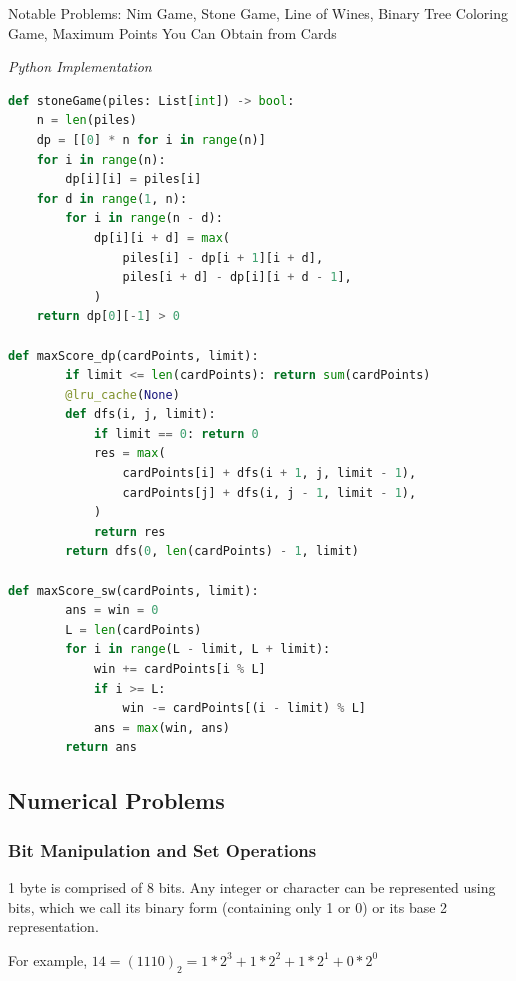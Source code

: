 \documentclass{article}
\begin{document}
Notable Problems: Nim Game, Stone Game, Line of Wines, Binary Tree Coloring Game, Maximum Points You Can Obtain from Cards

\vspace{8pt} \emph{Python Implementation}
\begin{lstlisting}[language=Python]
def stoneGame(piles: List[int]) -> bool:
    n = len(piles)
    dp = [[0] * n for i in range(n)]
    for i in range(n):
        dp[i][i] = piles[i]
    for d in range(1, n):
        for i in range(n - d):
            dp[i][i + d] = max(
                piles[i] - dp[i + 1][i + d],
                piles[i + d] - dp[i][i + d - 1],
            )
    return dp[0][-1] > 0

def maxScore_dp(cardPoints, limit):
        if limit <= len(cardPoints): return sum(cardPoints)
        @lru_cache(None)
        def dfs(i, j, limit):
            if limit == 0: return 0
            res = max(
                cardPoints[i] + dfs(i + 1, j, limit - 1), 
                cardPoints[j] + dfs(i, j - 1, limit - 1),
            )
            return res
        return dfs(0, len(cardPoints) - 1, limit)
        
def maxScore_sw(cardPoints, limit):
        ans = win = 0
        L = len(cardPoints)
        for i in range(L - limit, L + limit):
            win += cardPoints[i % L]
            if i >= L:
                win -= cardPoints[(i - limit) % L]
            ans = max(win, ans)    
        return ans
\end{lstlisting}

    \subsection{Numerical Problems}
    
    \subsubsection{Bit Manipulation and Set Operations}
    1 byte is comprised of 8 bits. Any integer or character can be represented using bits, which we call its binary form (containing only 1 or 0) or its base 2 representation.
    
    For example, $14 = (1110)_2 = 1 * 2^3 + 1 * 2^2 + 1 * 2^1 + 0 * 2^0$  
    
\end{document}
